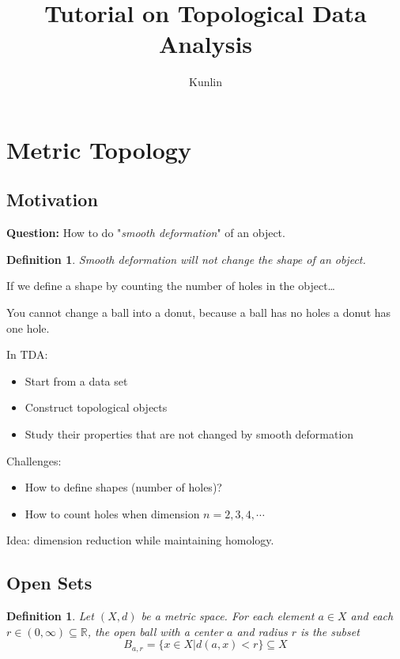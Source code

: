 \documentclass[12pt,a4paper]{article}
\theoremstyle{plain}
\newtheorem{definition}[theorem]{Definition}
\begin{document}
\title{Tutorial on Topological Data Analysis}
\author{Kunlin}
\maketitle

\section{Metric Topology}

\subsection{Motivation}

\textbf{Question: } How to do "\emph{smooth deformation}" of an object. 

\begin{definition}
    Smooth deformation will not change the shape of an object. 
\end{definition}
If we define a shape by counting the number of holes in the object\dots

You cannot change a ball into a donut, because a ball has no holes a donut has one hole. 

In TDA:
\begin{itemize}
    \item Start from a data set
    \item Construct topological objects
    \item Study their properties that are not changed by smooth deformation
\end{itemize}

Challenges: 
\begin{itemize}
    \item How to define shapes (number of holes)?
    \item How to count holes when dimension $n=2,3,4,\cdots$
\end{itemize}

Idea: dimension reduction while maintaining homology. 

\subsection{Open Sets}

\begin{definition}
    Let $(X,d)$ be a metric space. For each element $a \in X$ and each $r\in (0, \infty) \subseteq \mathbb{R}$, the \emph{open ball with a center $a$ and radius $r$} is the subset 
    \begin{equation}
        B_{a,r}=\{x\in X | d(a,x) < r\} \subseteq X
    \end{equation}
\end{definition}
\end{document}
